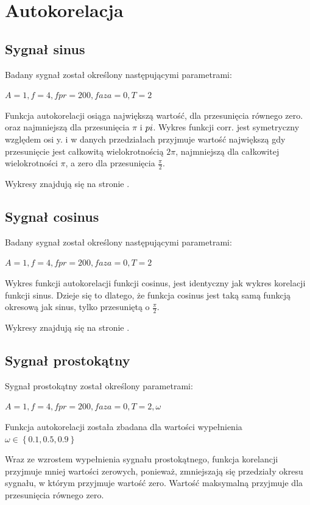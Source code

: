 \documentclass[wide,a4paper,titlepage,12pt]{mwart}
\begin{document}
  
  \section{Autokorelacja}
	  \subsection{Sygnał sinus}
		\label{auto_sin}
		Badany sygnał został określony następującymi parametrami:
		
		$A=1, f=4, fpr=200, faza=0, T=2$
				
		Funkcja autokorelacji osiąga największą wartość, dla przesunięcia równego zero. oraz najmniejszą dla przesunięcia $\pi$ i $\-pi$. Wykres funkcji corr. jest symetryczny względem osi y. i w danych przedziałach przyjmuje wartość największą gdy przesunięcie jest całkowitą wielokrotnością $2\pi$, najmniejszą dla całkowitej wielokrotności $\pi$, a zero dla przesunięcia $\frac{\pi}{2}$.
		
      	Wykresy znajdują się na stronie \pageref{wykres1}.

	  \subsection{Sygnał cosinus}
		\label{auto_cos}
		Badany sygnał został określony następującymi parametrami:
		
		$A=1, f=4, fpr=200, faza=0, T=2$
		
		Wykres funkcji autokorelacji funkcji cosinus, jest identyczny jak wykres korelacji funkcji sinus. Dzieje się to dlatego, że funkcja cosinus jest taką samą funkcją okresową jak sinus, tylko przesuniętą o $\frac{\pi}{2}$.
		
		Wykresy znajdują się na stronie \pageref{wykres1}.

	  \subsection{Sygnał prostokątny}
	  \label{auto_prostokat}
		Sygnał prostokątny został określony parametrami:
		
		$A=1, f=4, fpr=200, faza=0, T=2, \omega$
		
		Funkcja autokorelacji została zbadana dla wartości wypełnienia $\omega \in \left \{0.1, 0.5, 0.9\right \}$
		
		Wraz ze wzrostem wypełnienia sygnału prostokątnego, funkcja korelancji przyjmuje mniej wartości zerowych, ponieważ, zmniejszają się przedziały okresu sygnału, w którym przyjmuje wartość zero. Wartość maksymalną przyjmuje dla przesunięcia równego zero.
				
\end{document}
